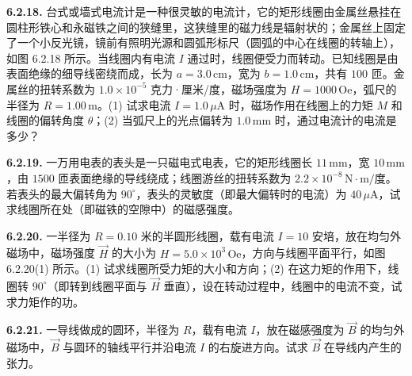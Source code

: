 \vfill
\newpage

\textbf{6.2.18.} 台式或墙式电流计是一种很灵敏的电流计，它的矩形线圈由金属丝悬挂在圆柱形铁心和永磁铁之间的狭缝里，这狭缝里的磁力线是辐射状的；金属丝上固定了一个小反光镜，镜前有照明光源和圆弧形标尺（圆弧的中心在线圈的转轴上），如图 6.2.18 所示。当线圈内有电流 $I$ 通过时，线圈便受力而转动。已知线圈是由表面绝缘的细导线密绕而成，长为 $a = 3.0\,\mathrm{cm}$，宽为 $b = 1.0\,\mathrm{cm}$，共有 $100$ 匝。金属丝的扭转系数为 $1.0 \times 10^{-5}$ 克力·厘米/度，磁场强度为 $H = 1000\,\mathrm{Oe}$，弧尺的半径为 $R = 1.00\,\mathrm{m}$。(1) 试求电流 $I = 1.0\,\mu\mathrm{A}$ 时，磁场作用在线圈上的力矩 $M$ 和线圈的偏转角度 $\theta$；(2) 当弧尺上的光点偏转为 $1.0\,\mathrm{mm}$ 时，通过电流计的电流是多少？

\begin{center}
  \begin{minipage}[b]{0.47\linewidth}
    \centering
  \end{minipage}\hfill
  \begin{minipage}[b]{0.47\linewidth}
    \centering
  \end{minipage}
\end{center}

\vfill
\newpage

\textbf{6.2.19.} 一万用电表的表头是一只磁电式电表，它的矩形线圈长 $11\,\mathrm{mm}$，宽 $10\,\mathrm{mm}$，由 $1500$ 匝表面绝缘的导线绕成；线圈游丝的扭转系数为 $2.2 \times 10^{-8}\,\mathrm{N\cdot m/}$度。若表头的最大偏转角为 $90^{\circ}$，表头的灵敏度（即最大偏转时的电流）为 $40\,\mu\mathrm{A}$，试求线圈所在处（即磁铁的空隙中）的磁感强度。

\vfill
\newpage

\textbf{6.2.20.} 一半径为 $R = 0.10$ 米的半圆形线圈，载有电流 $I = 10$ 安培，放在均匀外磁场中，磁场强度 $\vec{H}$ 的大小为 $H = 5.0 \times 10^{3}\,\mathrm{Oe}$，方向与线圈平面平行，如图 6.2.20(1) 所示。(1) 试求线圈所受力矩的大小和方向；(2) 在这力矩的作用下，线圈转 $90^{\circ}$（即转到线圈平面与 $\vec{H}$ 垂直），设在转动过程中，线圈中的电流不变，试求力矩作的功。

\begin{center}
\end{center}

\vfill
\newpage

\textbf{6.2.21.} 一导线做成的圆环，半径为 $R$，载有电流 $I$，放在磁感强度为 $\vec{B}$ 的均匀外磁场中，$\vec{B}$ 与圆环的轴线平行并沿电流 $I$ 的右旋进方向。试求 $\vec{B}$ 在导线内产生的张力。

